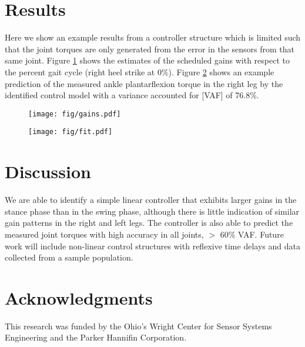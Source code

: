 \documentclass[10pt,letterpaper,notitlepage,twocolumn]{article}
\begin{document}
\section*{Results}
%
Here we show an example results from a controller structure which is limited
such that the joint torques are only generated from the error in the sensors
from that same joint. Figure \ref{fig:gains} shows the estimates of the
scheduled gains with respect to the percent gait cycle (right heel strike at
0\%). Figure \ref{fig:fit} shows an example prediction of the measured ankle
plantarflexion torque in the right leg by the identified control model with a
variance accounted for [VAF] of 76.8\%.
%
\begin{figure}
  \begin{center}
    \texttt{[image: fig/gains.pdf]}
    \label{fig:gains}
  \end{center}
\end{figure}
%
\begin{figure}
  \begin{center}
    \texttt{[image: fig/fit.pdf]}
    \label{fig:fit}
  \end{center}
\end{figure}
%
\section*{Discussion}
%
We are able to identify a simple linear controller that exhibits larger gains
in the stance phase than in the swing phase, although there is little
indication of similar gain patterns in the right and left legs. The controller
is also able to predict the measured joint torques with high accuracy in all
joints, $>$ 60\% VAF. Future work will include non-linear control structures
with reflexive time delays and data collected from a sample population.
%
\section*{Acknowledgments}

This research was funded by the Ohio's Wright Center for Sensor Systems
Engineering and the Parker Hannifin Corporation.
\end{document}
